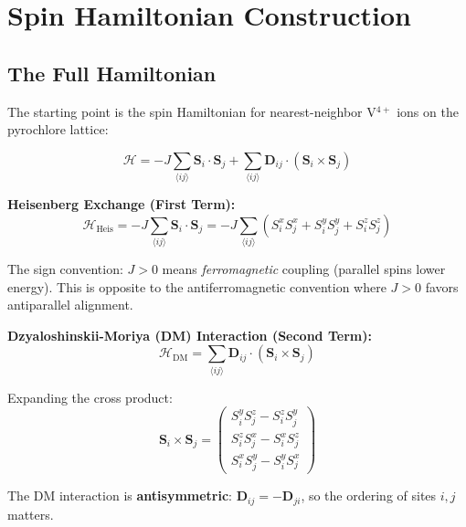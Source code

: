 \documentclass[11pt,letterpaper]{article}
\begin{document}
\section{Spin Hamiltonian Construction}

\subsection{The Full Hamiltonian}

The starting point is the spin Hamiltonian for nearest-neighbor V$^{4+}$ ions on the pyrochlore lattice:

\begin{equation}
\boxed{
\mathcal{H} = -J \sum_{\langle ij \rangle} \bm{S}_i \cdot \bm{S}_j
             + \sum_{\langle ij \rangle} \bm{D}_{ij} \cdot
               \left(\bm{S}_i \times \bm{S}_j\right)
}
\label{eq:Hfull}
\end{equation}

\begin{derivation}[title={Term-by-term breakdown}]
\textbf{Heisenberg Exchange (First Term):}
\begin{equation}
\mathcal{H}_{\text{Heis}} = -J \sum_{\langle ij \rangle} \bm{S}_i \cdot \bm{S}_j
= -J \sum_{\langle ij \rangle} \left( S_i^x S_j^x + S_i^y S_j^y + S_i^z S_j^z \right)
\end{equation}

The sign convention: $J > 0$ means \emph{ferromagnetic} coupling (parallel spins lower energy). This is opposite to the antiferromagnetic convention where $J > 0$ favors antiparallel alignment.

\textbf{Dzyaloshinskii-Moriya (DM) Interaction (Second Term):}
\begin{equation}
\mathcal{H}_{\text{DM}} = \sum_{\langle ij \rangle} \bm{D}_{ij} \cdot \left(\bm{S}_i \times \bm{S}_j\right)
\end{equation}

Expanding the cross product:
\begin{equation}
\bm{S}_i \times \bm{S}_j = 
\begin{pmatrix}
S_i^y S_j^z - S_i^z S_j^y \\
S_i^z S_j^x - S_i^x S_j^z \\
S_i^x S_j^y - S_i^y S_j^x
\end{pmatrix}
\end{equation}

The DM interaction is \textbf{antisymmetric}: $\bm{D}_{ij} = -\bm{D}_{ji}$, so the ordering of sites $i,j$ matters.
\end{derivation}
\end{document}
